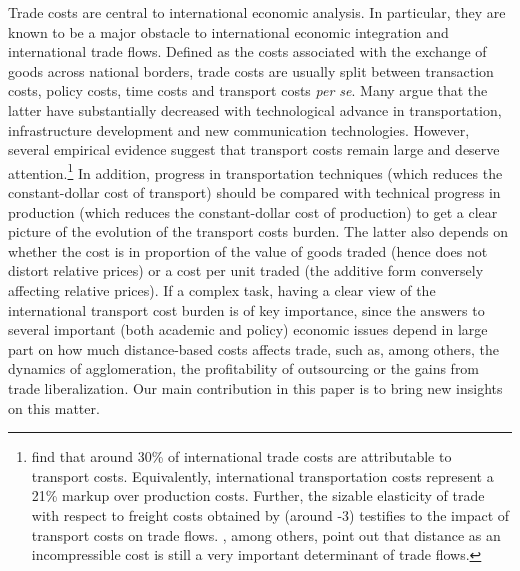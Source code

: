 \documentclass[a4paper,11pt]{article}
\begin{document}
Trade costs are central to international economic analysis. In particular, they are known to be a major obstacle to international economic integration and international trade flows. Defined as the costs associated with the exchange of goods across
national borders, trade costs are usually split between transaction costs, policy costs, time costs and transport costs \textit{per se}. Many argue that the latter have substantially decreased with technological advance in transportation, infrastructure development
and new communication technologies. However, several empirical evidence
suggest that transport costs remain large and deserve attention.\footnote{\cite{anderson_wincoop_jel} find that around 30\% of international trade costs are attributable to transport costs. Equivalently, international transportation costs represent a 21\% markup over production costs. Further, the sizable elasticity of trade with respect to freight costs obtained by \cite{Behar_Venables} (around -3) testifies to the impact of transport costs on trade flows. \cite{Disdier_Head08}, among others, point out that distance as an incompressible cost is still a very important determinant of trade flows.} In addition, progress in transportation techniques (which reduces the constant-dollar cost of transport) should be compared with technical progress in production (which reduces the constant-dollar cost of production) to get a clear picture of the evolution
of the transport costs burden. The latter also depends on whether the cost is in proportion of the value of goods traded (hence does not distort relative prices) or a cost per unit traded (the additive form conversely affecting relative prices). If a complex task, having a clear view of the international transport cost burden is of key importance, since the answers to several important (both academic and policy) economic issues depend in large part on how much distance-based costs affects trade, such as, among others, the dynamics of agglomeration, the profitability of outsourcing or the gains from trade liberalization. Our main contribution in this paper is to bring new insights on this matter.\smallskip
\end{document}
